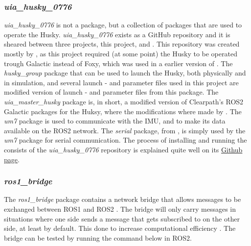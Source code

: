 \subsubsection{\textit{uia\_husky\_0776}}\label{subsubsec:uia_husky_0776}
\textit{uia\_husky\_0776} is not a package, but a collection of packages that are used to operate the Husky. \textit{uia\_husky\_0776} exists as a GitHub repository and it is sheared between three projects, this project, \cite{muggerud2023} and \cite{ovsthus2023}. This repository was created mostly by \cite{ovsthus2023}, as this project required (at some point) the Husky to be operated trough Galactic instead of Foxy, which was used in a earlier version of \cite{uia_husky_0776}. The \textit{husky\_group} package that can be used to launch the Husky, both physically and in simulation, and several launch - and parameter files used in this project are modified version of launch - and parameter files from this package. The \textit{uia\_master\_husky} package is, in short, a modified version of Clearpath's ROS2 Galactic packages for the Huksy, where the modifications where made by \cite{ovsthus2023}. The \textit{um7} package is used to communicate with the IMU, and to make its data available on the ROS2 network. The \textit{serial} package, from \cite{serial-communication-library}, is simply used by the \textit{um7} package for serial communication. The process of installing and running the consists of the \textit{uia\_husky\_0776} repository is explained quite well on its \href{https://github.com/orjano-max/uia_husky_0776}{Github page}.

\subsubsection{\textit{ros1\_bridge}}\label{subsubsec:ros1_bridge}
The \textit{ros1\_bridge} package contains a network bridge that allows messages to be exchanged between ROS1 and ROS2 \cite{ros1_bridge}. The bridge will only carry messages in situations where one side sends a message that gets subscribed to on the other side, at least by default. This done to increase computational efficiency \cite{ros1_bridge}. The bridge can be tested by running the command below in ROS2. 

\begin{tcolorbox}[width=\textwidth,colback={black},colupper=white, title={ubuntu terminal},colbacktitle=gray!125,coltitle=gray!50]\label{shell:echo}    
\end{tcolorbox}  


